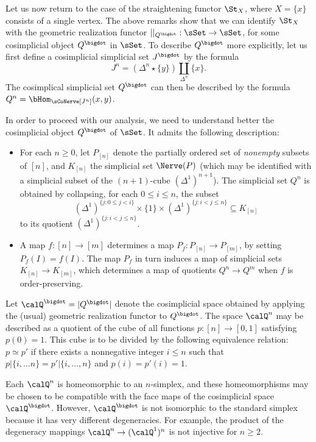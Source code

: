 Let us now return to the case of the straightening functor
$\St_{X}$, where $X = \{x\}$ consists of a single vertex. The above remarks show that
we can identify $\St_{X}$ with the geometric realization functor
$| |_{Q^{\bigdot}}: \sSet \rightarrow \sSet$, for some cosimplicial object
$Q^{\bigdot}$ in $\sSet$. To describe $Q^{\bigdot}$ more explicitly, let
us first define a cosimplicial simplicial set $J^{\bigdot}$ by the formula
$$ J^{n} = (\Delta^n \star \{y\}) \coprod_{ \Delta^n } \{x\}.$$
The cosimplical simplicial set $Q^{\bigdot}$ can then be described by the formula
$Q^{n} = \bHom_{ \sCoNerve[J^{n}]}(x,y)$. 

In order to proceed with our analysis, we need to understand better the cosimplicial object $Q^{\bigdot}$ of $\sSet$. It admits the following description:

\begin{itemize}
\item For each $n \geq 0$, let $P_{[n]}$ denote the partially ordered set of
{\em nonempty} subsets of $[n]$, and $K_{[n]}$ the simplicial set $\Nerve(P)$ (which may be identified with a simplicial subset of the $(n+1)$-cube $(\Delta^1)^{n+1}$).
The simplicial set $Q^{n}$ is obtained by collapsing, for
each $0 \leq i \leq n$, the subset
$$ ( \Delta^1 )^{ \{ j: 0 \leq j < i \} } \times
\{1\} \times (\Delta^1)^{ \{ j: i < j \leq n \} } \subseteq K_{[n]}$$
to its quotient $( \Delta^1)^{ \{ j: i < j \leq n \} }$. 

\item A map $f: [n] \rightarrow [m]$ determines a map $P_f: P_{[n]}
\rightarrow P_{[m]}$, by setting $P_f(I)=f(I)$. The map $P_f$ in turn
induces a map of simplicial sets $K_{[n]} \rightarrow K_{[m]}$, which
determines a map of quotients $Q^n \rightarrow Q^m$
when $f$ is order-preserving.
\end{itemize}

\begin{remark}
Let $\calQ^{\bigdot} = |Q^{\bigdot}|$ denote the cosimplicial space obtained by
applying the (usual) geometric realization functor to
$Q^{\bigdot}$. The space $\calQ^n$ may be described as a
quotient of the cube of all functions $p: [n] \rightarrow [0,1]$ satisfying $p(0)=1$. This cube is to be divided by the following equivalence relation: $p \simeq p'$ if there
exists a nonnegative integer $i \leq n$ such that $p| \{i, \ldots
n\} = p'| \{i, \ldots, n\}$ and $p(i) = p'(i) = 1$.

Each $\calQ^n$ is homeomorphic to an $n$-simplex, and these
homeomorphisms may be chosen to be compatible with the face maps
of the cosimplicial space $\calQ^{\bigdot}$. However,
$\calQ^{\bigdot}$ is not isomorphic to the standard simplex
because it has very different degeneracies. For example, the
product of the degeneracy mappings $\calQ^n \rightarrow
(\calQ^1)^n$ is not injective for $n \geq 2$.
\end{remark}

